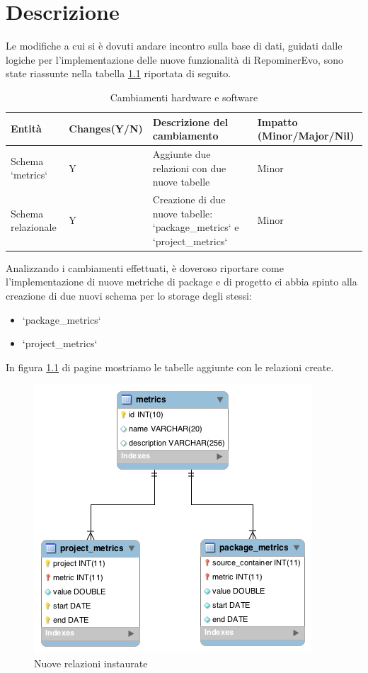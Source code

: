 \chapter{Descrizione}
Le modifiche a cui si è dovuti andare incontro sulla base di dati, guidati dalle logiche per l'implementazione delle nuove funzionalità di RepominerEvo, sono state riassunte nella tabella \ref{table:description} riportata di seguito.

\begin{table}[ht]
    \begin{tabular}{|p{3cm}|p{3cm}|p{3cm}|p{3cm}|}
        \hline
        \rowcolor[gray]{.80}

        Entità & Changes(Y/N) & Descrizione del cambiamento & Impatto (Minor/Major/Nil) \\ \hline
        Schema `metrics` & Y & Aggiunte due relazioni con due nuove tabelle & Minor \\ \hline
       
 Schema relazionale & Y & Creazione di due nuove tabelle: `package\_metrics` e `project\_metrics` & Minor \\ \hline
		
        \hline
    \end{tabular}
\caption{Cambiamenti hardware e software}\label{table:description}
\end{table}

Analizzando i cambiamenti effettuati, è doveroso riportare come l'implementazione di nuove metriche di package e di progetto ci abbia spinto alla creazione di due nuovi schema per lo storage degli stessi:
\begin{itemize}
\item `package\_metrics`
\item `project\_metrics`
\end{itemize}

In figura \ref{fig:dettaglioF} di pagine \pageref{fig:dettaglioF} mostriamo le tabelle aggiunte con le relazioni create.
\medskip
\begin{figure}[ht]
	\centering
	\includegraphics[width=.5\textwidth]{img/dettaglioFinal.png}
	\caption{Nuove relazioni instaurate}\label{fig:dettaglioF}
\end{figure}

